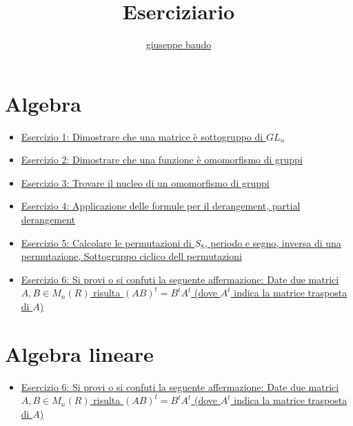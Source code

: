 \documentclass[a4paper,10pt]{article}
\title{Eserciziario}
\author{\href{http://www.baudo.hol.es}{giuseppe baudo}}
\begin{document}
\maketitle

\section{Algebra}
\begin{itemize}
 \item \href{./esercizio1.html}{Esercizio 1: Dimostrare che una matrice è sottogruppo di $GL_{n}$}
 \item \href{./esercizio2.html}{Esercizio 2: Dimostrare che una funzione è omomorfismo di gruppi}
 \item \href{./esercizio3.html}{Esercizio 3: Trovare il nucleo di un omomorfismo di gruppi}
 \item \href{./esercizio4.html}{Esercizio 4: Applicazione delle formule per il derangement, partial derangement}
 \item \href{./esercizio5.html}{Esercizio 5: Calcolare le permutazioni di $S_{8}$, periodo e segno, inversa di una permutazione, Sottogruppo ciclico dell permutazioni}
 \item \href{./esercizio6.html}{Esercizio 6: Si provi o si confuti la seguente affermazione: Date due matrici $A, B \in M_n(R)$ risulta $(AB)^t = B^tA^t$ (dove $A^t$ indica la matrice trasposta di $A$)}
\end{itemize}

\section{Algebra lineare}
\begin{itemize}
 \item \href{./esercizio6.html}{Esercizio 6: Si provi o si confuti la seguente affermazione: Date due matrici $A, B \in M_n(R)$ risulta $(AB)^t = B^tA^t$ (dove $A^t$ indica la matrice trasposta di $A$)}
\end{itemize}
\end{document}
